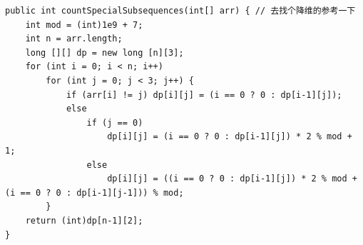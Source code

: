 \documentclass[9pt, b5paaper]{book}
\begin{document}
\begin{verbatim}
public int countSpecialSubsequences(int[] arr) { // 去找个降维的参考一下
    int mod = (int)1e9 + 7;
    int n = arr.length;
    long [][] dp = new long [n][3];
    for (int i = 0; i < n; i++) 
        for (int j = 0; j < 3; j++) {
            if (arr[i] != j) dp[i][j] = (i == 0 ? 0 : dp[i-1][j]);
            else 
                if (j == 0)
                    dp[i][j] = (i == 0 ? 0 : dp[i-1][j]) * 2 % mod + 1;
                else
                    dp[i][j] = ((i == 0 ? 0 : dp[i-1][j]) * 2 % mod + (i == 0 ? 0 : dp[i-1][j-1])) % mod;
        }
    return (int)dp[n-1][2];
}
\end{verbatim}
\end{document}
